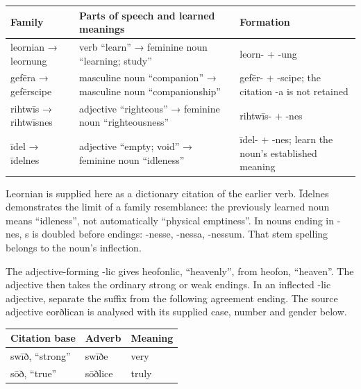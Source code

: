 \par\begingroup
\fontsize{10.5}{13.2}\selectfont
\setlength{\LTleft}{0pt}\setlength{\LTright}{\fill}
\noindent
\begin{tabular}{@{}>{\raggedright\arraybackslash}p{22.05mm}>{\raggedright\arraybackslash}p{52.92mm}>{\raggedright\arraybackslash}p{43.41mm}@{}}
\toprule
\textbf{Family} & \textbf{Parts of speech and learned meanings} & \textbf{Formation} \\
\midrule
leornian → leornung & verb “learn” → feminine noun “learning; study” & leorn- + -ung \\
gefēra → gefērscipe & masculine noun “companion” → masculine noun “companionship” & gefēr- + -scipe; the citation -a is not retained \\
rihtwīs → rihtwīsnes & adjective “righteous” → feminine noun “righteousness” & rihtwīs- + -nes \\
īdel → īdelnes & adjective “empty; void” → feminine noun “idleness” & īdel- + -nes; learn the noun’s established meaning \\
\bottomrule
\end{tabular}
\par\endgroup

Leornian is supplied here as a dictionary citation of the earlier verb. Īdelnes demonstrates the limit of a family resemblance: the previously learned noun means “idleness”, not automatically “physical emptiness”. In nouns ending in -nes, s is doubled before endings: -nesse, -nessa, -nessum. That stem spelling belongs to the noun’s inflection.

The adjective-forming -lic gives heofonlic, “heavenly”, from heofon, “heaven”. The adjective then takes the ordinary strong or weak endings. In an inflected -lic adjective, separate the suffix from the following agreement ending. The source adjective eorðlican is analysed with its supplied case, number and gender below.

\par\begingroup
\fontsize{10.5}{13.2}\selectfont
\setlength{\LTleft}{0pt}\setlength{\LTright}{\fill}
\noindent
\begin{tabular}{@{}>{\raggedright\arraybackslash}p{41.26mm}>{\raggedright\arraybackslash}p{38.56mm}>{\raggedright\arraybackslash}p{38.56mm}@{}}
\toprule
\textbf{Citation base} & \textbf{Adverb} & \textbf{Meaning} \\
\midrule
swīð, “strong” & swīðe & very \\
sōð, “true” & sōðlice & truly \\
\bottomrule
\end{tabular}
\par\endgroup

